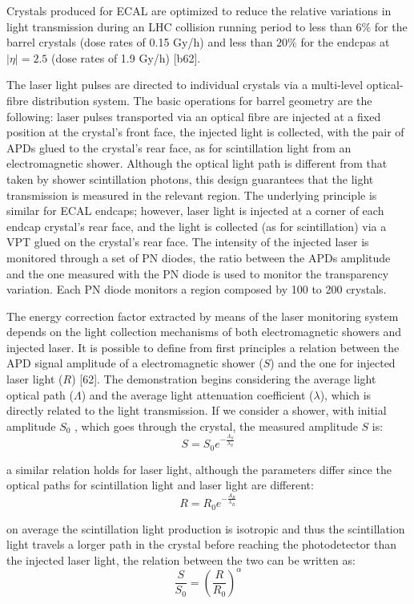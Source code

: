 Crystals produced for ECAL are optimized to reduce the relative variations in light transmission
during an LHC collision running period to less than $6\%$ for the barrel
crystals (dose rates of 0.15 Gy/h) and less than $20\%$ for the endcpas at $|\eta| = 2.5$ (dose rates of
1.9 Gy/h) [b62].

The laser light pulses are directed to individual crystals via a multi-level optical-fibre distribution
system. The basic operations for barrel geometry are the following: laser pulses transported via
an optical fibre are injected at a fixed position at the crystal’s front face, the injected light is
collected, with the pair of APDs glued to the crystal’s rear face, as for scintillation light from an
electromagnetic shower. Although the optical light path is different from that taken by shower
scintillation photons, this design guarantees that the light transmission is measured in the relevant region.
The underlying principle is similar for ECAL endcaps; however, laser light is injected
at a corner of each endcap crystal’s rear face, and the light is collected (as for scintillation) via
a VPT glued on the crystal’s rear face. The intensity of the injected laser is monitored through a set of PN diodes,
the ratio between the APDs amplitude and the one measured with
the PN diode is used to monitor the transparency variation. Each PN diode monitors a region composed by 100 to 200 crystals.

The energy correction factor extracted by means of the laser monitoring system depends on
the light collection mechanisms of both electromagnetic showers and injected laser.
It is possible to define from first principles a relation between
the APD signal amplitude of a electromagnetic shower ($S$) and the one for injected laser light ($R$) [62].
The demonstration begins considering the average light optical path ($\Lambda$) and the average light attenuation
coefficient ($\lambda$), which is directly related to the light transmission. If we consider a shower, with
initial amplitude $S_0$ , which goes through the crystal, the measured amplitude $S$ is:
\[
  S = S_0 e^{-\frac{\Lambda_S}{\lambda_S}}
\]

a similar relation holds for laser light, although the parameters differ since the optical paths for scintillation
light and laser light are different:
\[
  R = R_0 e^{-\frac{\Lambda_R}{\lambda_R}}
\]

on average the scintillation light production is isotropic and thus
the scintillation light travels a lorger path in the crystal before reaching the photodetector than the
injected laser light, the relation between the two can be written as:
\begin{equation}
  \frac{S}{S_0} = \left(\frac{R}{R_0}\right)^{\alpha}
\end{equation}
\label{eq:light_relation}

